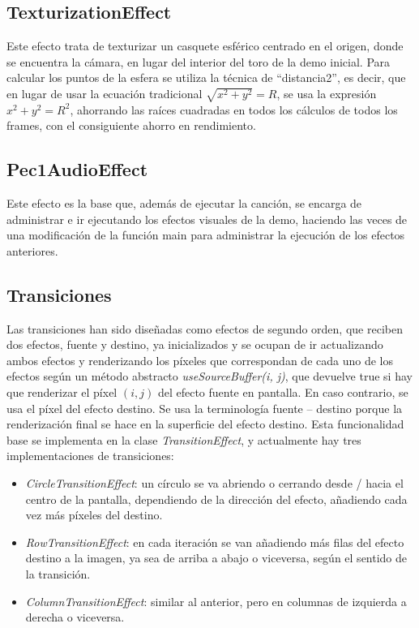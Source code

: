 \documentclass[12pt]{article}%
\begin{document}
\subsection{TexturizationEffect}
	Este efecto trata de texturizar un casquete esférico centrado en el origen, donde se encuentra la cámara, en lugar del interior del toro de la demo inicial. Para calcular los puntos de la esfera se utiliza la técnica de ``distancia2'', es decir, que en lugar de usar la ecuación tradicional $\sqrt{x^2 + y^2} = R$, se usa la expresión $x^2 + y^2 = R^2$, ahorrando las raíces cuadradas en todos los cálculos de todos los frames, con el consiguiente ahorro en rendimiento.

\subsection{Pec1AudioEffect}
	Este efecto es la base que, además de ejecutar la canción, se encarga de administrar e ir ejecutando los efectos visuales de la demo, haciendo las veces de una modificación de la función main para administrar la ejecución de los efectos anteriores.

\subsection{Transiciones}
	Las transiciones han sido diseñadas como efectos de segundo orden, que reciben dos efectos, fuente y destino, ya inicializados y se ocupan de ir actualizando ambos efectos y renderizando los píxeles que correspondan de cada uno de los efectos según un método abstracto \textit{useSourceBuffer(i, j)}, que devuelve true si hay que renderizar el píxel $(i, j)$ del efecto fuente en pantalla. En caso contrario, se usa el píxel del efecto destino. Se usa la terminología fuente -- destino porque la renderización final se hace en la superficie del efecto destino. Esta funcionalidad base se implementa en la clase \textit{TransitionEffect}, y actualmente hay tres implementaciones de transiciones:
	\begin{itemize}
		\item \textit{CircleTransitionEffect}: un círculo se va abriendo o cerrando desde / hacia el centro de la pantalla, dependiendo de la dirección del efecto, añadiendo cada vez más píxeles del destino.
		\item \textit{RowTransitionEffect}: en cada iteración se van añadiendo más filas del efecto destino a la imagen, ya sea de arriba a abajo o viceversa, según el sentido de la transición.
		\item \textit{ColumnTransitionEffect}: similar al anterior, pero en columnas de izquierda a derecha o viceversa.
	\end{itemize}
	
\end{document}
